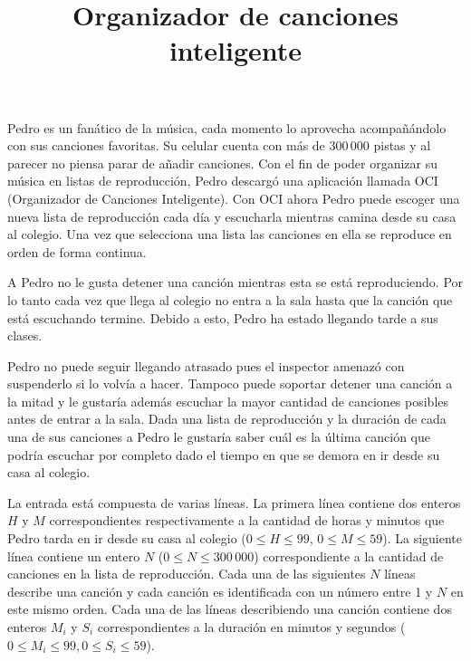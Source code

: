 \documentclass{oci}
\title{Organizador de canciones inteligente}
\begin{document}
\begin{problemDescription}
Pedro es un fanático de la música, cada momento lo aprovecha acompañándolo con
sus canciones favoritas.
Su celular cuenta con más de 300\,000 pistas y al parecer no piensa parar de
añadir canciones.
Con el fin de poder organizar su música en listas de reproducción, Pedro
descargó una aplicación llamada OCI (Organizador de Canciones Inteligente).
Con OCI ahora Pedro puede escoger una nueva lista de reproducción cada día y
escucharla mientras camina desde su casa al colegio.
Una vez que selecciona una lista las canciones en ella se reproduce en orden de
forma continua.

A Pedro no le gusta detener una canción mientras esta se está reproduciendo.
Por lo tanto cada vez que llega al colegio no entra a la sala hasta que la
canción que está escuchando termine.
Debido a esto, Pedro ha estado llegando tarde a sus clases.

Pedro no puede seguir llegando atrasado pues el inspector amenazó
con suspenderlo si lo volvía a hacer.
Tampoco puede soportar detener una canción a la mitad y le gustaría además
escuchar la mayor cantidad de canciones posibles antes de entrar a la sala.
Dada una lista de reproducción y la duración de cada una de sus canciones a
Pedro le gustaría saber cuál es la última canción que podría escuchar por
completo dado el tiempo en que se demora en ir desde su casa al colegio.

\end{problemDescription}

\begin{inputDescription}
  La entrada está compuesta de varias líneas.
  La primera línea contiene dos enteros $H$ y $M$ correspondientes
  respectivamente a la cantidad de horas y minutos que Pedro tarda en ir desde su
  casa al colegio ($0\leq H\leq 99$, $0\leq M\leq 59$).
  La siguiente línea contiene un entero $N$ ($0\leq N\leq 300\,000$)
  correspondiente a la cantidad de canciones en la lista de reproducción.
  Cada una de las siguientes $N$ líneas describe una canción y cada canción es
  identificada con un número entre 1 y $N$ en este mismo orden.
  Cada una de las líneas describiendo una canción contiene dos enteros $M_i$ y $S_i$
  correspondientes a la duración en minutos y segundos ($0\leq
  M_i\leq 99, 0\leq S_i\leq 59$).
\end{inputDescription}
\end{document}
